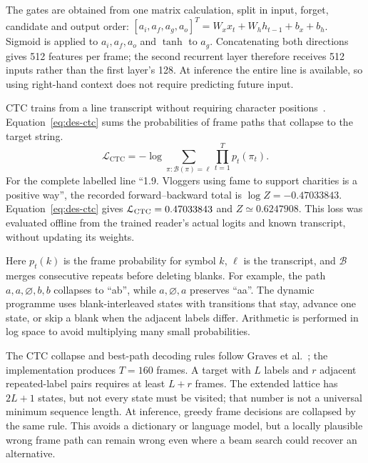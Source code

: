 The gates are obtained from one matrix calculation, split in input, forget, candidate and output order: $[a_i,a_f,a_g,a_o]^T=W_xx_t+W_hh_{t-1}+b_x+b_h$. Sigmoid is applied to $a_i,a_f,a_o$ and $\tanh$ to $a_g$. Concatenating both directions gives 512 features per frame; the second recurrent layer therefore receives 512 inputs rather than the first layer's 128. At inference the entire line is available, so using right-hand context does not require predicting future input.

CTC trains from a line transcript without requiring character positions~\cite[PDF pp.~2--3]{graves2006}. Equation~\ref{eq:des-ctc} sums the probabilities of frame paths that collapse to the target string.
\begin{equation}
\mathcal L_{\mathrm{CTC}}=-\log\sum_{\pi:\mathcal B(\pi)=\boldsymbol\ell}
\prod_{t=1}^{T}p_t(\pi_t).
\label{eq:des-ctc}
\end{equation}
For the complete labelled line ``1.9. Vloggers using fame to support charities is a positive way'', the recorded forward--backward total is $\log Z=-0.47033843$. Equation~\ref{eq:des-ctc} gives $\mathcal L_{\rm CTC}=0.47033843$ and $Z\simeq0.6247908$. This loss was evaluated offline from the trained reader's actual logits and known transcript, without updating its weights.

Here $p_t(k)$ is the frame probability for symbol $k$, $\boldsymbol\ell$ is the transcript, and $\mathcal B$ merges consecutive repeats before deleting blanks. For example, the path $a,a,\varnothing,b,b$ collapses to ``ab'', while $a,\varnothing,a$ preserves ``aa''. The dynamic programme uses blank-interleaved states with transitions that stay, advance one state, or skip a blank when the adjacent labels differ. Arithmetic is performed in log space to avoid multiplying many small probabilities.

The CTC collapse and best-path decoding rules follow Graves et al.~\cite[PDF pp.~2--3]{graves2006}; the implementation produces $T=160$ frames. A target with $L$ labels and $r$ adjacent repeated-label pairs requires at least $L+r$ frames. The extended lattice has $2L+1$ states, but not every state must be visited; that number is not a universal minimum sequence length. At inference, greedy frame decisions are collapsed by the same rule. This avoids a dictionary or language model, but a locally plausible wrong frame path can remain wrong even where a beam search could recover an alternative.

